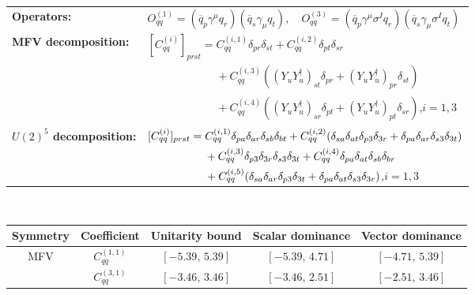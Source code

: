 \begin{table}[htbp]
\centering
{\small
\begin{tabular}{ll}
    \textbf{Operators:} &
        $\boxed{O_{qq}^{(1)} = (\overline q_p \gamma^\mu q_r)(\overline q_s \gamma_\mu q_t),\quad O_{qq}^{(3)} = (\overline q_p \gamma^\mu \sigma^I q_r)(\overline q_s \gamma_\mu \sigma^I q_t)}$ \\[0.2cm]
    \textbf{MFV decomposition:} &
        $[C_{qq}^{(i)}]_{prst} =
            C_{qq}^{(i,1)}\delta_{pr}\delta_{st}
            + C_{qq}^{(i,2)}\delta_{pt}\delta_{sr}
            $ \\
        & $\phantom{[C_{qq}^{(i)}]_{prst} ={}}+ C_{qq}^{(i,3)}((Y_u Y_u^\dagger)_{st}\delta_{pr} + (Y_u Y_u^\dagger)_{pr}\delta_{st})$ \\
        & $\phantom{[C_{qq}^{(i)}]_{prst} ={}}
            + C_{qq}^{(i,4)}((Y_u Y_u^\dagger)_{sr}\delta_{pt} + (Y_u Y_u^\dagger)_{pt}\delta_{sr})$,\quad $i=1,3$ \\[0.15cm]
    \textbf{$U(2)^5$ decomposition:} &
        $[C_{qq}^{(i)}]_{prst} =
            C_{qq}^{(i,1)}\Pij{p}{r}{a}\Pij{s}{t}{b}
            + C_{qq}^{(i,2)}(\Pij{s}{t}{a}\delta_{p3}\delta_{3r} + \Pij{p}{r}{a}\delta_{s3}\delta_{3t})
            $ \\
        & $\phantom{[C_{qq}^{(i)}]_{prst} ={}}+ C_{qq}^{(i,3)}\delta_{p3}\delta_{3r}\delta_{s3}\delta_{3t}
            + C_{qq}^{(i,4)}\Pij{p}{t}{a}\Pij{s}{r}{b}
            $ \\
        & $\phantom{[C_{qq}^{(i)}]_{prst} ={}}+ C_{qq}^{(i,5)}(\Pij{s}{r}{a}\delta_{p3}\delta_{3t} + \Pij{p}{t}{a}\delta_{s3}\delta_{3r})$,\quad $i=1,3$ \\
\end{tabular}
\\[0.3cm]
\renewcommand{\arraystretch}{1.3}
\begin{tabular}{ccccc}
    \toprule
    \rowcolor{hdrcolor}
    \textbf{Symmetry} & \textbf{Coefficient}
        & \textbf{Unitarity bound}
        & \textbf{Scalar dominance}
        & \textbf{Vector dominance} \\
    \midrule
    \multirow{8}{*}{MFV}
        & $C_{qq}^{(1,1)}$ & $[-5.39,\, 5.39]$ & $[-5.39,\, 4.71]$ & $[-4.71,\, 5.39]$ \\
        & $C_{qq}^{(3,1)}$ & $[-3.46,\, 3.46]$ & $[-3.46,\, 2.51]$ & $[-2.51,\, 3.46]$ \\

\end{tabular}}
\end{table}
